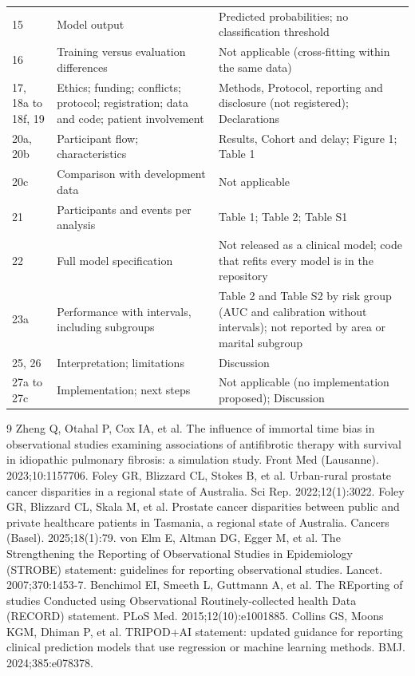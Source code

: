 \documentclass[10pt,a4paper]{article}
\begin{document}
{\begin{longtable}{@{}>{\raggedright}p{2.3cm}>{\raggedright}p{5.0cm}>{\raggedright\arraybackslash}p{7.8cm}@{}}
15 & Model output & Predicted probabilities; no classification threshold \\
16 & Training versus evaluation differences & Not applicable (cross-fitting within the same data) \\
17, 18a to 18f, 19 & Ethics; funding; conflicts; protocol; registration; data and code; patient involvement & Methods, Protocol, reporting and disclosure (not registered); Declarations \\
20a, 20b & Participant flow; characteristics & Results, Cohort and delay; Figure 1; Table 1 \\
20c & Comparison with development data & Not applicable \\
21 & Participants and events per analysis & Table 1; Table 2; Table S1 \\
22 & Full model specification & Not released as a clinical model; code that refits every model is in the repository \\
23a & Performance with intervals, including subgroups & Table 2 and Table S2 by risk group (AUC and calibration without intervals); not reported by area or marital subgroup \\
25, 26 & Interpretation; limitations & Discussion \\
27a to 27c & Implementation; next steps & Not applicable (no implementation proposed); Discussion \\
\bottomrule
\end{longtable}
}

{\small
\begin{thebibliography}{9}
\setlength{\itemsep}{0.1em}
 Zheng Q, Otahal P, Cox IA, et al. The influence of immortal time bias in observational studies examining associations of antifibrotic therapy with survival in idiopathic pulmonary fibrosis: a simulation study. Front Med (Lausanne). 2023;10:1157706.
 Foley GR, Blizzard CL, Stokes B, et al. Urban-rural prostate cancer disparities in a regional state of Australia. Sci Rep. 2022;12(1):3022.
 Foley GR, Blizzard CL, Skala M, et al. Prostate cancer disparities between public and private healthcare patients in Tasmania, a regional state of Australia. Cancers (Basel). 2025;18(1):79.
 von Elm E, Altman DG, Egger M, et al. The Strengthening the Reporting of Observational Studies in Epidemiology (STROBE) statement: guidelines for reporting observational studies. Lancet. 2007;370:1453-7.
 Benchimol EI, Smeeth L, Guttmann A, et al. The REporting of studies Conducted using Observational Routinely-collected health Data (RECORD) statement. PLoS Med. 2015;12(10):e1001885.
 Collins GS, Moons KGM, Dhiman P, et al. TRIPOD+AI statement: updated guidance for reporting clinical prediction models that use regression or machine learning methods. BMJ. 2024;385:e078378.
\end{thebibliography}
}
\end{document}
